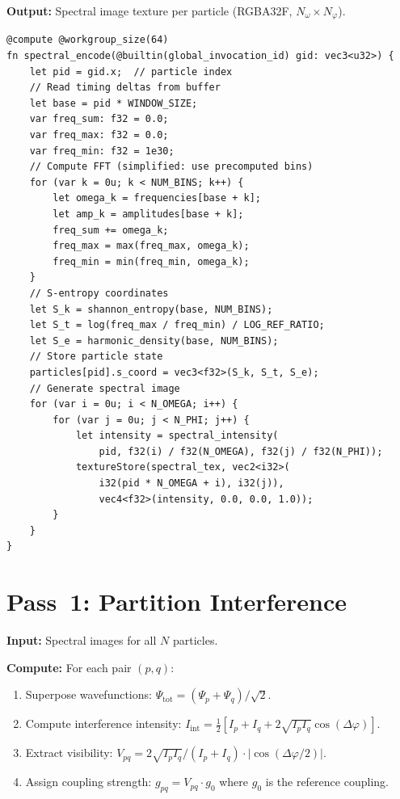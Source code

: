 \textbf{Output:} Spectral image texture per particle (RGBA32F, $N_\omega \times N_\varphi$).

\begin{lstlisting}[style=wgsl,caption={Pass 0: Spectral Encoding (WGSL pseudocode)}]
@compute @workgroup_size(64)
fn spectral_encode(@builtin(global_invocation_id) gid: vec3<u32>) {
    let pid = gid.x;  // particle index
    // Read timing deltas from buffer
    let base = pid * WINDOW_SIZE;
    var freq_sum: f32 = 0.0;
    var freq_max: f32 = 0.0;
    var freq_min: f32 = 1e30;
    // Compute FFT (simplified: use precomputed bins)
    for (var k = 0u; k < NUM_BINS; k++) {
        let omega_k = frequencies[base + k];
        let amp_k = amplitudes[base + k];
        freq_sum += omega_k;
        freq_max = max(freq_max, omega_k);
        freq_min = min(freq_min, omega_k);
    }
    // S-entropy coordinates
    let S_k = shannon_entropy(base, NUM_BINS);
    let S_t = log(freq_max / freq_min) / LOG_REF_RATIO;
    let S_e = harmonic_density(base, NUM_BINS);
    // Store particle state
    particles[pid].s_coord = vec3<f32>(S_k, S_t, S_e);
    // Generate spectral image
    for (var i = 0u; i < N_OMEGA; i++) {
        for (var j = 0u; j < N_PHI; j++) {
            let intensity = spectral_intensity(
                pid, f32(i) / f32(N_OMEGA), f32(j) / f32(N_PHI));
            textureStore(spectral_tex, vec2<i32>(
                i32(pid * N_OMEGA + i), i32(j)),
                vec4<f32>(intensity, 0.0, 0.0, 1.0));
        }
    }
}
\end{lstlisting}

\section{Pass~1: Partition Interference}
\label{sec:pass1}

\textbf{Input:} Spectral images for all $N$ particles.

\textbf{Compute:} For each pair $(p, q)$:
\begin{enumerate}
    \item Superpose wavefunctions: $\Psi_{\mathrm{tot}} = (\Psi_p + \Psi_q)/\sqrt{2}$.
    \item Compute interference intensity: $I_{\mathrm{int}} = \tfrac{1}{2}[I_p + I_q + 2\sqrt{I_p I_q}\cos(\Delta\varphi)]$.
    \item Extract visibility: $V_{pq} = 2\sqrt{I_p I_q}/(I_p + I_q) \cdot |\cos(\Delta\varphi/2)|$.
    \item Assign coupling strength: $g_{pq} = V_{pq} \cdot g_0$ where $g_0$ is the reference coupling.
\end{enumerate}

